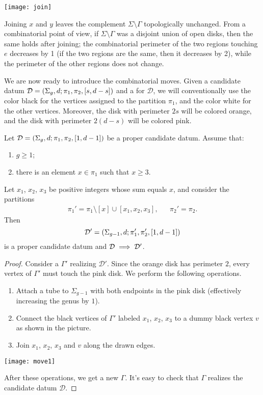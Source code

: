 \documentclass{article}
\begin{document}
\begin{center}
\texttt{[image: join]}
\end{center}

Joining $x$ and $y$ leaves the complement $\Sigma\setminus\Gamma$ topologically unchanged. From a combinatorial point of view, if $\Sigma\setminus\Gamma$ was a disjoint union of open disks, then the same holds after joining; the combinatorial perimeter of the two regions touching $e$ decreases by 1 (if the two regions are the same, then it decreases by 2), while the perimeter of the other regions does not change.

We are now ready to introduce the combinatorial moves. Given a candidate datum $\mathcal{D}=\left(\Sigma_g,d;\pi_1,\pi_2,[s,d-s]\right)$ and a \dessin{} for $\mathcal{D}$, we will conventionally use the color black for the vertices assigned to the partition $\pi_1$, and the color white for the other vertices. Moreover, the disk with perimeter $2s$ will be colored orange, and the disk with perimeter $2(d-s)$ will be colored pink.

\begin{combinatorialmove}\label{move:s1-3}
Let $\mathcal{D}=\left(\Sigma_g,d;\pi_1,\pi_2,[1,d-1]\right)$ be a proper candidate datum. Assume that:
\begin{enumerate}
\item $g\ge 1$;
\item there is an element $x\in\pi_1$ such that $x\ge 3$.
\end{enumerate}
Let $x_1$, $x_2$, $x_3$ be positive integers whose sum equals $x$, and consider the partitions
\begin{align*}
\pi_1'=\pi_1\setminus[x]\cup[x_1,x_2,x_3],&&\pi_2'=\pi_2.
\end{align*}
Then
\[
\mathcal{D'}=\left(\Sigma_{g-1},d;\pi_1',\pi_2',[1,d-1]\right)
\]
is a proper candidate datum and $\mathcal{D}\implies\mathcal{D}'$.
\end{combinatorialmove}
\begin{proof}
Consider a \dessin{} $\Gamma'$ realizing $\mathcal{D}'$. Since the orange disk has perimeter $2$, every vertex of $\Gamma'$ must touch the pink disk. We perform the following operations.
\begin{enumerate}
\item Attach a tube to $\Sigma_{g-1}$ with both endpoints in the pink disk (effectively increasing the genus by $1$).
\item Connect the black vertices of $\Gamma'$ labeled $x_1$, $x_2$, $x_3$ to a dummy black vertex $v$ as shown in the picture.
\item Join $x_1$, $x_2$, $x_3$ and $v$ along the drawn edges.
\end{enumerate}
\begin{center}
\texttt{[image: move1]}
\end{center}
After these operations, we get a new \dessin{} $\Gamma$. It's easy to check that $\Gamma$ realizes the candidate datum $\mathcal{D}$.
\end{proof}
\end{document}
